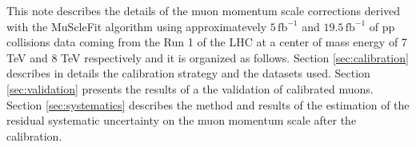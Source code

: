 This note describes the details of the muon momentum scale corrections derived with the MuScleFit 
algorithm using approximatevely $5\,\mathrm{fb}^{-1}$ and $19.5\,\mathrm{fb}^{-1}$ of pp 
collisions data coming from the Run 1 of the LHC at a center of mass energy 
of 7 TeV and 8 TeV respectively and it is organized as follows. Section \ref{sec:calibration} describes 
in details the calibration strategy and the datasets used. Section \ref{sec:validation} presents the 
results of a the validation of calibrated muons. Section \ref{sec:systematics} describes the method and 
results of the estimation of the residual systematic uncertainty on the muon momentum scale 
after the calibration.



